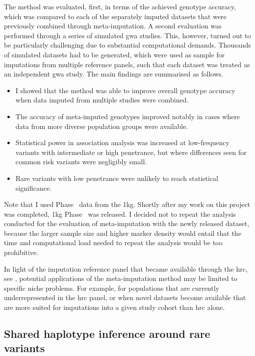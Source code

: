 The method was evaluated, first, in terms of the achieved genotype accuracy, which was compared to each of the separately imputed datasets that were previously combined through meta-imputation.
A second evaluation was performed through a series of simulated \gls{gwa} studies.
This, however, turned out to be particularly challenging due to substantial computational demands.
Thousands of simulated datasets had to be generated, which were used as sample for imputations from multiple reference panels, such that each dataset was treated as an independent \gls{gwa} study.
The main findings are summarised as follows.
\begin{itemize}
\item%
I showed that the method was able to improve overall genotype accuracy when data imputed from multiple studies were combined.
\item%
The accuracy of meta-imputed genotypes improved notably in cases where data from more diverse population groups were available.
\item%
Statistical power in association analysis was increased at low-frequency variants with intermediate or high penetrance, but where differences seen for common risk variants were negligibly small.
\item%
Rare variants with low penetrance were unlikely to reach statistical significance.
\end{itemize}

Note that I used Phase~ data from the \gls{1kg}.
Shortly after my work on this project was completed, \gls{1kg} Phase~ was released.
I decided not to repeat the analysis conducted for the evaluation of meta-imputation with the newly released dataset, because the larger sample size and higher marker density would entail that the time and computational load needed to repeat the analysis would be too prohibitive.

In light of the imputation reference panel that became available through the \gls{hrc}, see \citet{McCarthy:2016gs}, potential applications of the meta-imputation method may be limited to specific niche problems.
For example, for populations that are currently underrepresented in the \gls{hrc} panel, or when novel datasets become available that are more suited for imputations into a given study cohort than \gls{hrc} alone.




\subsection{Shared haplotype inference around rare variants}


